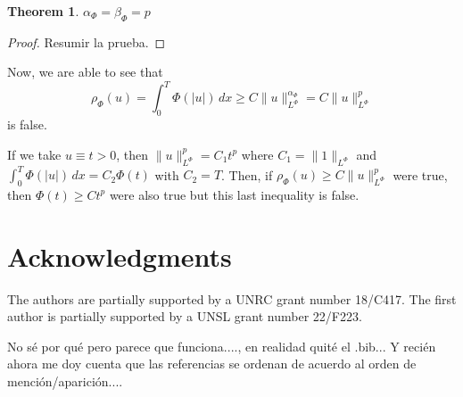\documentclass[twoside]{article}
\newtheorem{thm}{Theorem}[section]
\theoremstyle{remark}
\newcommand{\orlnor}{\|_{L^{\Phi}}}
\begin{document}
\begin{thm}
$\alpha_{\Phi}=\beta_{\Phi}=p$
\end{thm}

\begin{proof}
Resumir la prueba.
\end{proof}
Now, we are able to see that 
\[
\rho_{\Phi}(u)=\int_0^T \Phi(|u|)\,dx\geq C\|u\orlnor^{\alpha_{\Phi}}=C\|u\orlnor^p
\]
is false.

If we take $u\equiv t>0$, then $\|u\orlnor^p=C_1t^p$ where $C_1=\|1\orlnor$ and
$\int_0^T \Phi(|u|)\,dx=C_2\Phi(t)$ with $C_2=T$. 
Then, if $\rho_{\Phi}(u)\geq C\|u\orlnor^p$ were true, then $\Phi(t)\geq C t^p$ were also true but this
last inequality is false.
 

\section*{Acknowledgments}
The authors are partially supported by a UNRC grant number 18/C417. The first author is  partially supported by a  UNSL grant number 22/F223. 


No s\'e por qu\'e pero parece que funciona...., en realidad quit\'e el .bib...
Y reci\'en ahora me doy cuenta que las referencias se ordenan de acuerdo al orden de menci\'on/aparici\'on....
  
 
\end{document}
